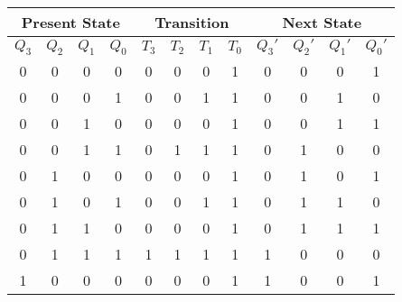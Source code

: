 \documentclass{article}
\begin{document}
\begin{center}
	\begin{tabular}{|c|c|c|c|c|c|c|c|c|c|c|c|}
		\hline
		\multicolumn{4}{|c|}{Present State} & \multicolumn{4}{c|}{Transition} & \multicolumn{4}{c|}{Next State}                                                                             \\
		\hline
		$Q_3$                               & $Q_2$                           & $Q_1$                           & $Q_0$ & $T_3$ & $T_2$ & $T_1$ & $T_0$ & $Q_3'$ & $Q_2'$ & $Q_1'$ & $Q_0'$ \\
		\hline
		0                                   & 0                               & 0                               & 0     & 0     & 0     & 0     & 1     & 0      & 0      & 0      & 1      \\
		0                                   & 0                               & 0                               & 1     & 0     & 0     & 1     & 1     & 0      & 0      & 1      & 0      \\
		0                                   & 0                               & 1                               & 0     & 0     & 0     & 0     & 1     & 0      & 0      & 1      & 1      \\
		0                                   & 0                               & 1                               & 1     & 0     & 1     & 1     & 1     & 0      & 1      & 0      & 0      \\
		0                                   & 1                               & 0                               & 0     & 0     & 0     & 0     & 1     & 0      & 1      & 0      & 1      \\
		0                                   & 1                               & 0                               & 1     & 0     & 0     & 1     & 1     & 0      & 1      & 1      & 0      \\
		0                                   & 1                               & 1                               & 0     & 0     & 0     & 0     & 1     & 0      & 1      & 1      & 1      \\
		0                                   & 1                               & 1                               & 1     & 1     & 1     & 1     & 1     & 1      & 0      & 0      & 0      \\
		1                                   & 0                               & 0                               & 0     & 0     & 0     & 0     & 1     & 1      & 0      & 0      & 1      \\

\end{tabular}
\end{center}
\end{document}
